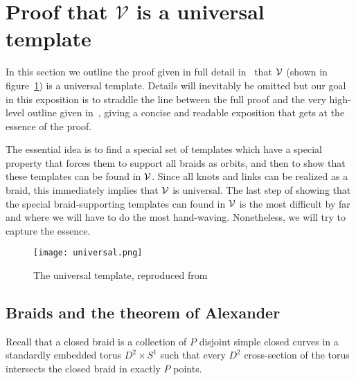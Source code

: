 \documentclass[paper.tex]{subfiles}
\begin{document}
\section{Proof that $\mathcal{V}$ is a universal template}

In this section we outline the proof given in full detail in~\cite{Ghrist1996} that $\mathcal{V}$ (shown in figure~\ref{fig:universal}) is a universal template. Details will inevitably be omitted but our goal in this exposition is to straddle the line between
the full proof and the very high-level outline given in~\cite{knottyode}, giving a concise and readable exposition that gets at the essence of the proof.

The essential idea is to find a special set of templates which have a special property that forces them to support all braids as orbits, and then to show that these templates can be found in $\mathcal{V}$. Since all knots and links
can be realized as a braid, this immediately implies that $\mathcal{V}$ is universal. The last step of showing that the special braid-supporting templates can found in $\mathcal{V}$ is the most difficult by far and where we will have to do the
most hand-waving. Nonetheless, we will try to capture the essence.

\begin{figure}[h]

  \centering
  \texttt{[image: universal.png]}
  \caption{The universal template, reproduced from~\cite{knottyode}}\label{fig:universal}
\end{figure}

\subsection{Braids and the theorem of Alexander}

Recall that a closed braid is a collection of $P$ disjoint simple closed curves in a standardly embedded torus $D^2 \times S^1$ such that every $D^2$ cross-section of the torus intersects the closed braid in exactly $P$ points.

\end{document}
